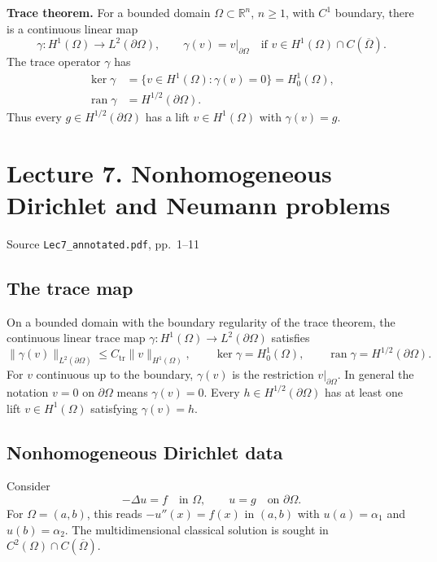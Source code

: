 \documentclass[11pt,a4paper]{article}
\newcommand{\lecturesource}[1]{%
  \par{\small\sffamily\color{Muted}#1}\par\vspace{0.15em}}
\begin{document}
\medskip
\noindent\textbf{Trace theorem.}
For a bounded domain \(\Omega\subset\mathbb R^n\), \(n\ge 1\),
with \(C^1\) boundary, there is a continuous linear map
\[
  \gamma\colon H^1(\Omega)\longrightarrow L^2(\partial\Omega),
  \qquad
  \gamma(v)=v|_{\partial\Omega}\quad
  \text{if }v\in H^1(\Omega)\cap C(\overline\Omega).
\]
The trace operator \(\gamma\) has
\begin{align*}
  \ker\gamma
    &=\{v\in H^1(\Omega):\gamma(v)=0\}=H_0^1(\Omega),\\
  \operatorname{ran}\gamma&=H^{1/2}(\partial\Omega).
\end{align*}
Thus every \(g\in H^{1/2}(\partial\Omega)\) has a lift
\(v\in H^1(\Omega)\) with \(\gamma(v)=g\).

\clearpage
\section{Lecture 7. Nonhomogeneous Dirichlet and Neumann problems}
\lecturesource{Source \enspace\texttt{Lec7\_annotated.pdf}, pp.~1--11}

\subsection{The trace map}

On a bounded domain with the boundary regularity of the trace
theorem, the continuous linear trace map
\(\gamma\colon H^1(\Omega)\to L^2(\partial\Omega)\) satisfies
\[
  \|\gamma(v)\|_{L^2(\partial\Omega)}
  \le C_{\mathrm{tr}}\|v\|_{H^1(\Omega)},\qquad
  \ker\gamma=H_0^1(\Omega),\qquad
  \operatorname{ran}\gamma=H^{1/2}(\partial\Omega).
\]
For \(v\) continuous up to the boundary, \(\gamma(v)\) is the restriction
\(v|_{\partial\Omega}\). In general the notation \(v=0\) on
\(\partial\Omega\) means \(\gamma(v)=0\). Every
\(h\in H^{1/2}(\partial\Omega)\) has at least one lift
\(v\in H^1(\Omega)\) satisfying \(\gamma(v)=h\).

\subsection{Nonhomogeneous Dirichlet data}

Consider
\[
  -\Delta u=f\quad\text{in }\Omega,\qquad
  u=g\quad\text{on }\partial\Omega.
\]
For \(\Omega=(a,b)\), this reads \(-u''(x)=f(x)\) in \((a,b)\)
with \(u(a)=\alpha_1\) and \(u(b)=\alpha_2\).
The multidimensional classical solution is sought in
\(C^2(\Omega)\cap C(\overline\Omega)\).
\end{document}
